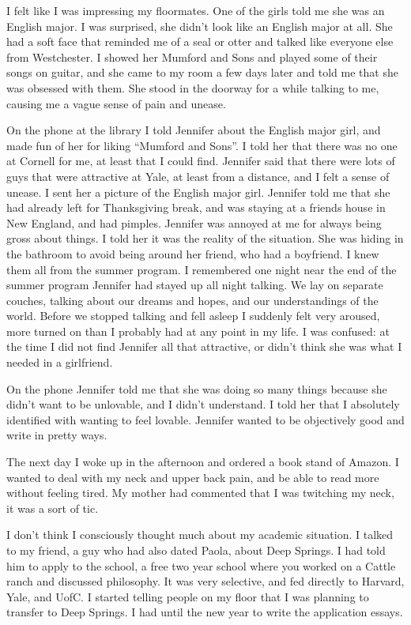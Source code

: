 I felt like I was impressing my floormates.  One of the girls told me she was an
English major.  I was surprised, she didn't look like an English major at all.
She had a soft face that reminded me of a seal or otter and talked like everyone
else from Westchester.  I showed her Mumford and Sons and played some of their
songs on guitar, and she came to my room a few days later and told me that she
was obsessed with them.  She stood in the doorway for a while talking to me,
causing me a vague sense of pain and unease.

On the phone at the library I told Jennifer about the English major girl, and
made fun of her for liking ``Mumford and Sons''.  I told her that there was no
one at Cornell for me, at least that I could find.  Jennifer said that there
were lots of guys that were attractive at Yale, at least from a distance, and I
felt a sense of unease.  I sent her a picture of the English major girl.
Jennifer told me that she had already left for Thanksgiving break, and was
staying at a friends house in New England, and had pimples.  Jennifer was
annoyed at me for always being gross about things.  I told her it was the
reality of the situation.  She was hiding in the bathroom to avoid being around
her friend, who had a boyfriend.  I knew them all from the summer program.  I
remembered one night near the end of the summer program Jennifer had stayed up
all night talking.  We lay on separate couches, talking about our dreams and
hopes, and our understandings of the world.  Before we stopped talking and fell
asleep I suddenly felt very aroused, more turned on than I probably had at any
point in my life.  I was confused: at the time I did not find Jennifer all that
attractive, or didn't think she was what I needed in a girlfriend.  

On the phone Jennifer told me that she was doing so many things because she
didn't want to be unlovable, and I didn't understand.  I told her that I
absolutely identified with wanting to feel lovable.  Jennifer wanted to be
objectively good and write in pretty ways.

The next day I woke up in the afternoon and ordered a book stand of Amazon.  I
wanted to deal with my neck and upper back pain, and be able to read more
without feeling tired.  My mother had commented that I was twitching my neck, it
was a sort of tic. 

I don't think I consciously thought much about my academic situation.  I talked
to my friend, a guy who had also dated Paola, about Deep Springs.  I had told
him to apply to the school, a free two year school where you worked on a Cattle
ranch and discussed philosophy.  It was very selective, and fed directly to
Harvard, Yale, and UofC.  I started telling people on my floor that I was
planning to transfer to Deep Springs.  I had until the new year to write the
application essays.

